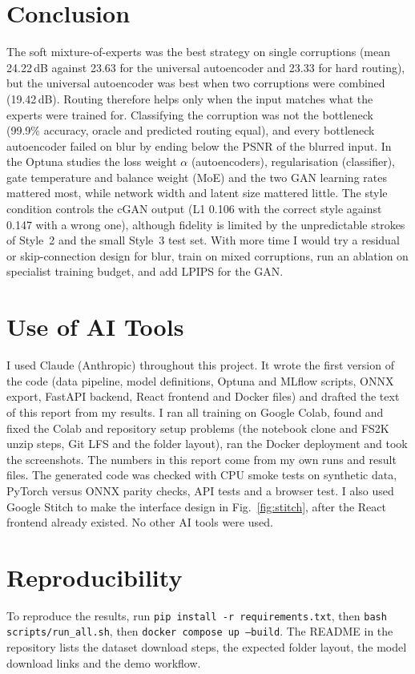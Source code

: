 \documentclass[conference]{IEEEtran}
\let\oldsection\section
\renewcommand{\section}[1]{\oldsection{\textbf{#1}}}
\begin{document}
\section{Conclusion}
The soft mixture-of-experts was the best strategy on single corruptions (mean 24.22\,dB against 23.63 for the universal autoencoder and 23.33 for hard routing), but the universal autoencoder was best when two corruptions were combined (19.42\,dB). Routing therefore helps only when the input matches what the experts were trained for. Classifying the corruption was not the bottleneck (99.9\% accuracy, oracle and predicted routing equal), and every bottleneck autoencoder failed on blur by ending below the PSNR of the blurred input. In the Optuna studies the loss weight $\alpha$ (autoencoders), regularisation (classifier), gate temperature and balance weight (MoE) and the two GAN learning rates mattered most, while network width and latent size mattered little. The style condition controls the cGAN output (L1 0.106 with the correct style against 0.147 with a wrong one), although fidelity is limited by the unpredictable strokes of Style~2 and the small Style~3 test set. With more time I would try a residual or skip-connection design for blur, train on mixed corruptions, run an ablation on specialist training budget, and add LPIPS for the GAN.

\appendices
\section{Use of AI Tools}
I used Claude (Anthropic) throughout this project. It wrote the first version of the code (data pipeline, model definitions, Optuna and MLflow scripts, ONNX export, FastAPI backend, React frontend and Docker files) and drafted the text of this report from my results. I ran all training on Google Colab, found and fixed the Colab and repository setup problems (the notebook clone and FS2K unzip steps, Git LFS and the folder layout), ran the Docker deployment and took the screenshots. The numbers in this report come from my own runs and result files. The generated code was checked with CPU smoke tests on synthetic data, PyTorch versus ONNX parity checks, API tests and a browser test. I also used Google Stitch to make the interface design in Fig.~\ref{fig:stitch}, after the React frontend already existed. No other AI tools were used.

\section{Reproducibility}
To reproduce the results, run \texttt{pip install -r requirements.txt}, then \texttt{bash scripts/run\_all.sh}, then \texttt{docker compose up --build}. The README in the repository lists the dataset download steps, the expected folder layout, the model download links and the demo workflow.
\end{document}
